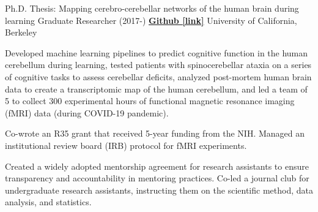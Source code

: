 

\begin{cventries}

  \cventry
    {Ph.D. Thesis: Mapping cerebro-cerebellar networks of the human brain during learning}
    {Graduate Researcher (2017-)} %
    {\href{https://github.com/maedbhk/cerebellum_learning_connect}{\textbf{Github [link]}}}
    {University of California, Berkeley} %
    {
      \begin{cvitems} %
        \item {Developed machine learning pipelines to predict cognitive function in the human cerebellum during learning, tested patients with spinocerebellar ataxia on a series of cognitive tasks to assess cerebellar deficits, analyzed post-mortem  human brain data to create a transcriptomic map of the human cerebellum, and led a team of 5 to collect 300 experimental hours of functional magnetic resonance imaging (fMRI) data (during COVID-19 pandemic).}
        \item {Co-wrote an R35 grant that received 5-year funding from the NIH. Managed an institutional review board (IRB) protocol for fMRI experiments.}
        \item {Created a widely adopted mentorship agreement for research assistants to ensure transparency and accountability in mentoring practices. Co-led a journal club for undergraduate research assistants, instructing them on the scientific method, data analysis, and statistics.}
      \end{cvitems}
    }
    

\end{cventries}
